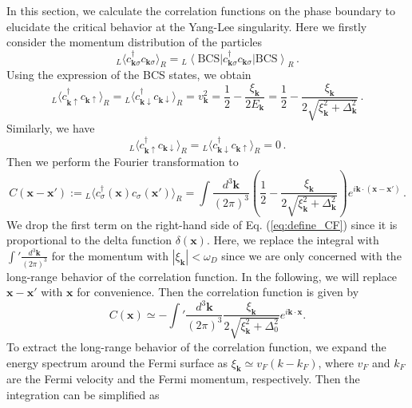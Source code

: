 \documentclass[aps,onecolumn,superscriptaddress,notitlepage,longbibliography]{revtex4-1}
\begin{document}
In this section, we calculate the correlation functions on the phase boundary to elucidate the critical behavior at the Yang-Lee singularity. Here we firstly consider the momentum distribution of the particles
\begin{equation}
  {}_L\langle c_{\bm{k} \sigma}^{\dagger} c_{\bm{k} \sigma} \rangle_R = {}_L \left\langle
  \text{BCS} \right| c_{\bm{k} \sigma}^{\dagger} c_{\bm{k} \sigma} \left| \text{BCS}\right\rangle_R \,.
\end{equation}
Using the expression of the BCS states, we obtain
\begin{equation}
  {}_L\langle c_{\bm{k} \uparrow}^{\dagger} c_{\bm{k} \uparrow} \rangle_R = {}_L\langle c_{\bm{k}\downarrow}^{\dagger} c_{\bm{k} \downarrow} \rangle_R = v_{\bm{k}}^2 = \frac{1}{2} -
  \frac{\xi_{\bm{k}}}{2 E_{\bm{k}}} = \frac{1}{2} - \frac{\xi_{\bm{k}}}{2 \sqrt{\xi_{\bm{k}}^2 +
  \Delta_{\bm{k}}^2}}\,.
\end{equation}
Similarly, we have 
\begin{equation}
  {}_L\langle c_{\bm{k} \uparrow}^{\dagger} c_{\bm{k} \downarrow} \rangle_R = {}_L\langle c_{\bm{k}\downarrow}^{\dagger} c_{\bm{k} \uparrow} \rangle_R = 0\,.
\end{equation}
Then we perform the Fourier transformation to 
\begin{equation}
  C (\bm{x}-\bm{x}') := {}_L\langle c_{\sigma}^{\dagger} (\bm{x}) c_{\sigma} (\bm{x}') \rangle_R = \int \frac{d^3 \bm{k}}{(2 \pi)^3} \left(\frac{1}{2} - \frac{\xi_{\bm{k}}}{2 \sqrt{\xi_{\bm{k}}^2 + \Delta_{\bm{k}}^2}} \right)e^{i\bm{k} \cdot (\bm{x}-\bm{x}')}\,.
\label{eq:define_CF}
\end{equation}
We drop the first term on the right-hand side of Eq. (\ref{eq:define_CF}) since it is proportional to the delta function $\delta(\bm{x})$. Here, we replace the integral with $\int ' \frac{d^3 \bm{k}}{(2 \pi)^3}$ for the momentum with $|\xi_{\bm{k}}|<\omega_D$ since we are only concerned with the long-range behavior of the correlation function. 
In the following, we will replace $\bm{x}-\bm{x}'$
with $\bm{x}$ for convenience. Then the correlation
function is given by
\begin{equation}
  C (\bm{x}) \simeq -\int ' \frac{d^3 \bm{k}}{(2 \pi)^3} \frac{\xi_{\bm{k}}}{2 \sqrt{\xi_{\bm{k}}^2
  + \Delta_0^2}} e^{i\bm{k} \cdot \bm{x}}.
\end{equation}
 To extract the long-range behavior of the correlation function, we expand the energy spectrum around the Fermi surface as $\xi_{\bm{k}} \simeq v_F (k - k_F)$, where $v_F$ and $k_F$ are the Fermi velocity and the Fermi momentum, respectively. Then the integration can be simplified as
\end{document}
